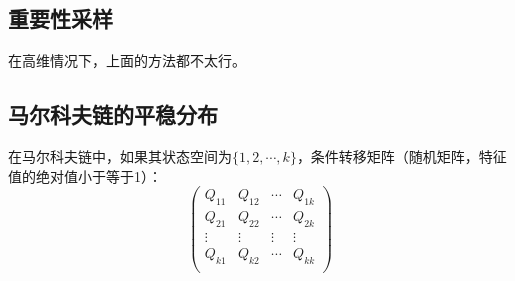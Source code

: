 \documentclass[UTF8]{ctexart} %
\begin{document}
				\begin{figure}[H]
				\end{figure}	
			\subsection{重要性采样}
				\begin{figure}[H]
				\end{figure}
				在高维情况下，上面的方法都不太行。
			\subsection{马尔科夫链的平稳分布}
				在马尔科夫链中，如果其状态空间为$\{1,2,\cdots,k\}$，条件转移矩阵（随机矩阵，特征值的绝对值小于等于1）：
				\[\begin{pmatrix}
				Q_{11}&Q_{12}&\cdots&Q_{1k}\\
				Q_{21}&Q_{22}&\cdots&Q_{2k}\\
				\vdots&\vdots&\vdots&\vdots\\
				Q_{k1}&Q_{k2}&\cdots&Q_{kk}\\
				\end{pmatrix}\]
				
\end{document}
